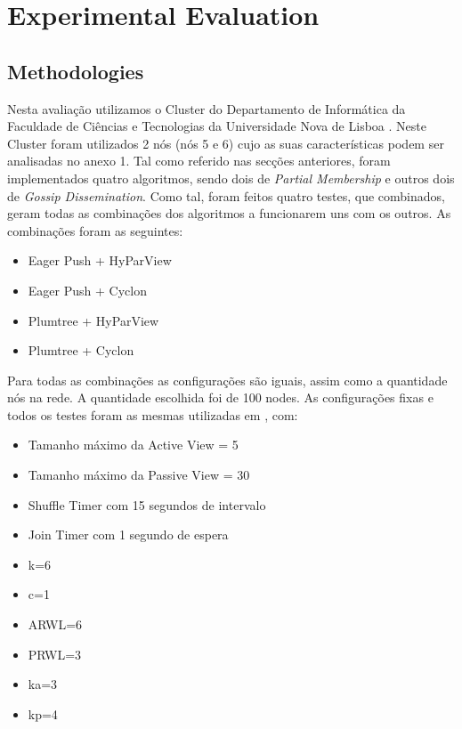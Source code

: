\section{Experimental Evaluation}

\subsection{Methodologies}
Nesta avaliação utilizamos o Cluster do Departamento de Informática da Faculdade de Ciências e Tecnologias da Universidade Nova de Lisboa \cite{cluster}. Neste Cluster foram utilizados 2 nós (nós 5 e 6) cujo as suas características podem ser analisadas no anexo 1. Tal como referido nas secções anteriores, foram implementados quatro algoritmos, sendo dois de \textit{Partial Membership} e outros dois de \textit{Gossip Dissemination}. Como tal, foram feitos quatro testes, que combinados, geram todas as combinações dos algoritmos a funcionarem uns com os outros. As combinações foram as seguintes:
\begin{itemize}
    \item Eager Push + HyParView
    \item Eager Push + Cyclon
    \item Plumtree + HyParView
    \item Plumtree + Cyclon
\end{itemize}

Para todas as combinações as configurações são iguais, assim como a quantidade nós na rede. A quantidade escolhida foi de 100 nodes. As configurações fixas e todos os testes foram as mesmas utilizadas em \cite{hyparview} \cite{plumtree}, com: 
\begin{itemize}
    \item Tamanho máximo da Active View = 5
    \item Tamanho máximo da Passive View = 30
    \item Shuffle Timer com 15 segundos de intervalo
    \item Join Timer com 1 segundo de espera
    \item k=6 
    \item c=1
    \item ARWL=6
    \item PRWL=3
    \item ka=3
    \item kp=4
\end{itemize}

